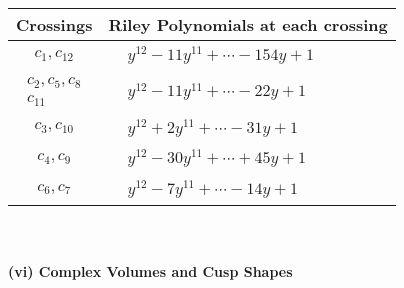 \documentclass[1p]{elsarticle_modified}
\theoremstyle{definition}
\begin{document}
\begin{tabular}{m{50pt}|m{274pt}}
Crossings & \hspace{64pt}Riley Polynomials at each crossing \\
\hline $$\begin{aligned}c_{1},c_{12}\end{aligned}$$&$\begin{aligned}
&y^{12}-11 y^{11}+\cdots-154 y+1
\end{aligned}$\\
\hline $$\begin{aligned}c_{2},c_{5},c_{8}\\c_{11}\end{aligned}$$&$\begin{aligned}
&y^{12}-11 y^{11}+\cdots-22 y+1
\end{aligned}$\\
\hline $$\begin{aligned}c_{3},c_{10}\end{aligned}$$&$\begin{aligned}
&y^{12}+2 y^{11}+\cdots-31 y+1
\end{aligned}$\\
\hline $$\begin{aligned}c_{4},c_{9}\end{aligned}$$&$\begin{aligned}
&y^{12}-30 y^{11}+\cdots+45 y+1
\end{aligned}$\\
\hline $$\begin{aligned}c_{6},c_{7}\end{aligned}$$&$\begin{aligned}
&y^{12}-7 y^{11}+\cdots-14 y+1
\end{aligned}$\\
\hline
\end{tabular}\\~\\
\newpage\flushleft \textbf{(vi) Complex Volumes and Cusp Shapes}
\end{document}
